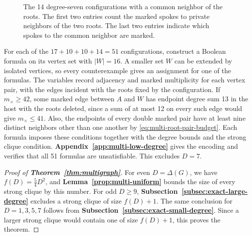 \documentclass[preprint,11pt,numbers]{elsarticle-arxiv}
\makeatletter
\newcommand{\FloatBarrier}{\par\ifx\@deferlist\@empty\else\clearpage\fi}}
\numberwithin{equation}{section}
\theoremstyle{definition}
\newenvironment{lateproof}[1]{\begin{proof}[Proof of #1]}{\end{proof}}
\makeatother
\begin{document}
\begin{figure}[htbp]
\caption{The 14 degree-seven configurations with a common neighbor of the roots. The first two entries count the marked spokes to private neighbors of the two roots. The last two entries indicate which spokes to the common neighbor are marked.}
\label{fig:finite-seven-shared}
\end{figure}
\relax\space%
\FloatBarrier

For each of the $17+10+10+14=51$ configurations, construct
a Boolean formula on its vertex set with $|W|=16$. A smaller
set $W$ can be extended by isolated vertices, so every
counterexample gives an assignment for one of the formulas.
The variables record adjacency and marked multiplicity for
each vertex pair, with the edges incident with the roots
fixed by the configuration. If $m_\times\geq42$,
some marked edge between $A$ and $W$ has endpoint degree sum 13
in the host with the roots deleted, since a sum of at most 12 on
every such edge would give $m_\times\leq41$. Also, the endpoints
of every double marked pair have at least nine distinct neighbors
other than one another by \eqref{eq:multi-root-pair-budget}.
Each formula imposes these conditions together with the
degree bounds and the strong clique condition.
\textbf{Appendix~\ref{app:multi-low-degree}} gives the encoding
and verifies that all 51 formulas are unsatisfiable. This
excludes $D=7$.
\relax\space%

\begin{lateproof}{\textbf{Theorem~\ref{thm:multigraph}}}
For even $D=\Delta(G)$, we have $f(D)=\frac{5}{4}D^2$, and
\textbf{Lemma~\ref{prop:multi-uniform}} bounds the size of
every strong clique by this number. For odd $D\geq9$,
\textbf{Subsection~\ref{subsec:exact-large-degree}} excludes
a strong clique of size $f(D)+1$. The same conclusion for
$D=1,3,5,7$ follows from
\textbf{Subsection~\ref{subsec:exact-small-degree}}.
Since a larger strong clique would contain one of size
$f(D)+1$, this proves the theorem.
\end{lateproof}
\relax\space%
\FloatBarrier
\end{document}
